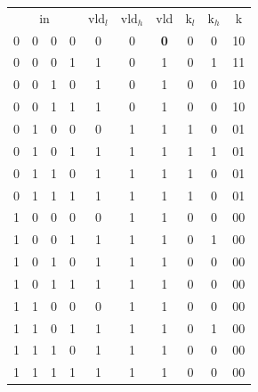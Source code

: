 \begin{figure}[h!]
\begin{minipage}[b]{0.5\linewidth}
        \centering
        \begin{tabular}{cccccccccc}
        \toprule
        \multicolumn{4}{c}{in} & $\text{vld}_l$ & $\text{vld}_h$ & vld & $\text{k}_l$ & $\text{k}_h$ & k \\
        \cmidrule{1-4} %
        0 & 0 & 0 & 0 & 0 & 0 & \textbf{0} & 0 & 0 & 10 \\
        0 & 0 & 0 & 1 & 1 & 0 & 1 & 0 & 1 & 11 \\
        0 & 0 & 1 & 0 & 1 & 0 & 1 & 0 & 0 & 10 \\
        0 & 0 & 1 & 1 & 1 & 0 & 1 & 0 & 0 & 10 \\
        0 & 1 & 0 & 0 & 0 & 1 & 1 & 1 & 0 & 01 \\
        0 & 1 & 0 & 1 & 1 & 1 & 1 & 1 & 1 & 01 \\
        0 & 1 & 1 & 0 & 1 & 1 & 1 & 1 & 0 & 01 \\
        0 & 1 & 1 & 1 & 1 & 1 & 1 & 1 & 0 & 01 \\
        1 & 0 & 0 & 0 & 0 & 1 & 1 & 0 & 0 & 00 \\
        1 & 0 & 0 & 1 & 1 & 1 & 1 & 0 & 1 & 00 \\
        1 & 0 & 1 & 0 & 1 & 1 & 1 & 0 & 0 & 00 \\
        1 & 0 & 1 & 1 & 1 & 1 & 1 & 0 & 0 & 00 \\
        1 & 1 & 0 & 0 & 0 & 1 & 1 & 0 & 0 & 00 \\
        1 & 1 & 0 & 1 & 1 & 1 & 1 & 0 & 1 & 00 \\
        1 & 1 & 1 & 0 & 1 & 1 & 1 & 0 & 0 & 00 \\
        1 & 1 & 1 & 1 & 1 & 1 & 1 & 0 & 0 & 00 \\
        \bottomrule
        \end{tabular}
        \label{table:lod42_truth_table}
    \end{minipage}
\end{figure}










